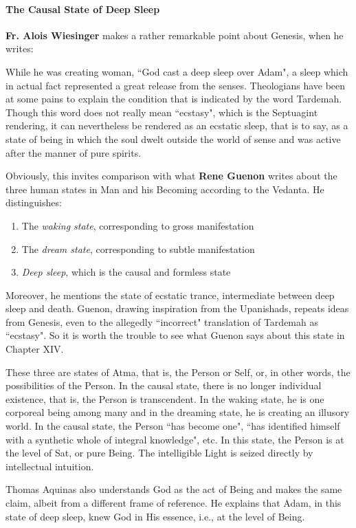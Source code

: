 \paragraph{The Causal State of Deep Sleep}

\textbf{Fr. Alois Wiesinger} makes a rather remarkable point about Genesis, when he writes:

\begin{quotex}
While he was creating woman, ``God cast a deep sleep over Adam", a sleep which in actual fact represented a great release from the senses. Theologians have been at some pains to explain the condition that is indicated by the word Tardemah. Though this word does not really mean ``ecstasy", which is the Septuagint rendering, it can nevertheless be rendered as an ecstatic sleep, that is to say, as a state of being in which the soul dwelt outside the world of sense and was active after the manner of pure spirits.

\end{quotex}
Obviously, this invites comparison with what \textbf{Rene Guenon} writes about the three human states in Man and his Becoming according to the Vedanta. He distinguishes:

\begin{enumerate}
\item The \emph{waking state}, corresponding to gross manifestation 
\item The \emph{dream state}, corresponding to subtle manifestation 
\item \emph{Deep sleep}, which is the causal and formless state 
\end{enumerate}
Moreover, he mentions the state of ecstatic trance, intermediate between deep sleep and death. Guenon, drawing inspiration from the Upanishads, repeats ideas from Genesis, even to the allegedly ``incorrect" translation of Tardemah as ``ecstasy". So it is worth the trouble to see what Guenon says about this state in Chapter XIV.

\begin{quotex}
These three are states of Atma, that is, the Person or Self, or, in other words, the possibilities of the Person. In the causal state, there is no longer individual existence, that is, the Person is transcendent. In the waking state, he is one corporeal being among many and in the dreaming state, he is creating an illusory world. In the causal state, the Person ``has become one", ``has identified himself with a synthetic whole of integral knowledge", etc. In this state, the Person is at the level of Sat, or pure Being. The intelligible Light is seized directly by intellectual intuition.

\end{quotex}
Thomas Aquinas also understands God as the act of Being and makes the same claim, albeit from a different frame of reference. He explains that Adam, in this state of deep sleep, knew God in His essence, i.e., at the level of Being.

